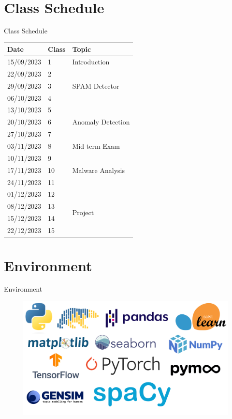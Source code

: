 \documentclass[hyperref={hidelinks}]{beamer}
\begin{document}
  \section{Class Schedule}
  \begin{frame}[allowframebreaks]{Class Schedule}
    \begin{table}[!ht]
      \footnotesize
      \centering
      \begin{tabular}{lll}
      \toprule
          Date & Class & Topic \\ \midrule
          15/09/2023 & 1 & Introduction \\ 
          22/09/2023 & 2 & \multirow{3}{*}{SPAM Detector} \\ 
          29/09/2023 & 3 \\ 
          06/10/2023 & 4 \\ 
          13/10/2023 & 5 & \multirow{3}{*}{Anomaly Detection} \\ 
          20/10/2023 & 6 \\ 
          27/10/2023 & 7 \\ 
          03/11/2023 & 8 & Mid-term Exam \\ 
          10/11/2023 & 9 & \multirow{3}{*}{Malware Analysis} \\ 
          17/11/2023 & 10 \\ 
          24/11/2023 & 11 \\ 
          01/12/2023 & 12 & \multirow{4}{*}{Project} \\ 
          08/12/2023 & 13 \\ 
          15/12/2023 & 14 \\ 
          22/12/2023 & 15 \\ \bottomrule
      \end{tabular}
  \end{table}  
  \end{frame}

  \section{Environment}
  \begin{frame}[allowframebreaks]{Environment}
    \begin{figure}
      \centering
      \includegraphics[width=\textwidth]{env}
      \end{figure}
  \end{frame}
\end{document}
